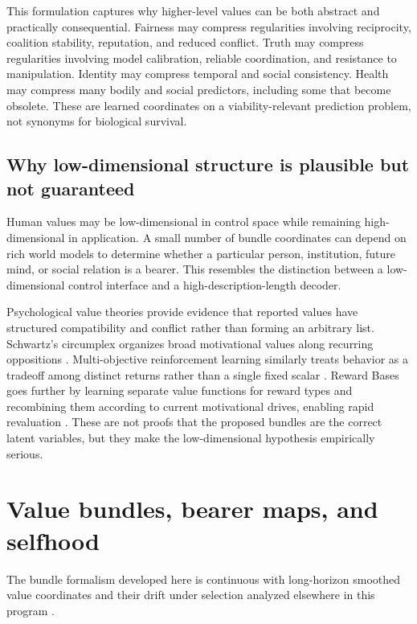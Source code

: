 \documentclass[11pt]{article}
\begin{document}
This formulation captures why higher-level values can be both abstract and practically consequential. Fairness may compress regularities involving reciprocity, coalition stability, reputation, and reduced conflict. Truth may compress regularities involving model calibration, reliable coordination, and resistance to manipulation. Identity may compress temporal and social consistency. Health may compress many bodily and social predictors, including some that become obsolete. These are learned coordinates on a viability-relevant prediction problem, not synonyms for biological survival.

\subsection{Why low-dimensional structure is plausible but not guaranteed}

Human values may be low-dimensional in control space while remaining high-dimensional in application. A small number of bundle coordinates can depend on rich world models to determine whether a particular person, institution, future mind, or social relation is a bearer. This resembles the distinction between a low-dimensional control interface and a high-description-length decoder.

Psychological value theories provide evidence that reported values have structured compatibility and conflict rather than forming an arbitrary list. Schwartz's circumplex organizes broad motivational values along recurring oppositions \citep{schwartz1992}. Multi-objective reinforcement learning similarly treats behavior as a tradeoff among distinct returns rather than a single fixed scalar \citep{hayes2022}. Reward Bases goes further by learning separate value functions for reward types and recombining them according to current motivational drives, enabling rapid revaluation \citep{millidge2024}. These are not proofs that the proposed bundles are the correct latent variables, but they make the low-dimensional hypothesis empirically serious.

\section{Value bundles, bearer maps, and selfhood}

The bundle formalism developed here is continuous with long-horizon smoothed value coordinates and their drift under selection analyzed elsewhere in this program \citep{zarncke2026vbd}.
\end{document}
